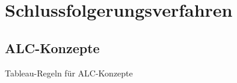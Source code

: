 \documentclass[a4paper]{article}
\title{\docTitle}
\author{Moritz}
\date{\today}
\begin{document}
\maketitle
\tableofcontents


\section{Schlussfolgerungsverfahren}

\subsection{ALC-Konzepte}

Tableau-Regeln für ALC-Konzepte
\end{document}
